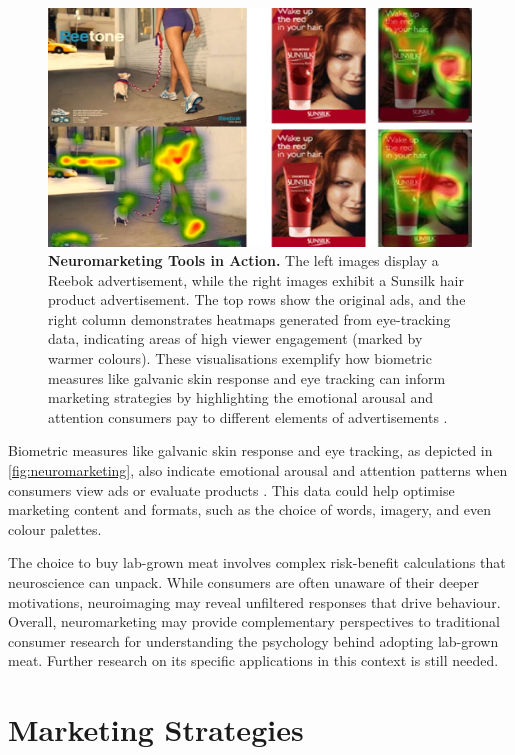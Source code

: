 \documentclass[10pt]{article}
\begin{document}
\begin{sloppypar}
  \begin{figure}[ht]
    \centering
    \includegraphics[width=\textwidth]{figures/neuromarketing.jpg}
    \caption[Neuromarketing Tools in Action.]{\textbf{Neuromarketing Tools in Action.} The left images display a Reebok advertisement, while the right images exhibit a Sunsilk hair product advertisement. The top rows show the original ads, and the right column demonstrates heatmaps generated from eye-tracking data, indicating areas of high viewer engagement (marked by warmer colours). These visualisations exemplify how biometric measures like galvanic skin response and eye tracking can inform marketing strategies by highlighting the emotional arousal and attention consumers pay to different elements of advertisements \citep{brandlab_nevromarketing_nodate}.}
    \label{fig:neuromarketing}
  \end{figure}

  Biometric measures like galvanic skin response and eye tracking, as depicted in \autoref{fig:neuromarketing}, also indicate emotional arousal and attention patterns when consumers view ads or evaluate products \citep{riedl_decade_2020}. This data could help optimise marketing content and formats, such as the choice of words, imagery, and even colour palettes.

  The choice to buy lab-grown meat involves complex risk-benefit calculations that neuroscience can unpack. While consumers are often unaware of their deeper motivations, neuroimaging may reveal unfiltered responses that drive behaviour. Overall, neuromarketing may provide complementary perspectives to traditional consumer research for understanding the psychology behind adopting lab-grown meat. Further research on its specific applications in this context is still needed.

  \section{Marketing Strategies}
  \label{sec:marketing-strategies}


\end{sloppypar}
\end{document}
